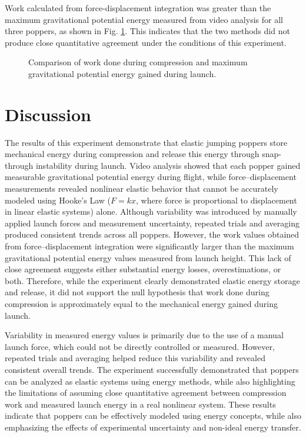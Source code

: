 \documentclass[12pt]{article}
\begin{document}
Work calculated from force-displacement integration was greater than the maximum gravitational potential energy measured from video analysis for all three poppers, as shown in Fig. \ref{fig:3}. This indicates that the two methods did not produce close quantitative agreement under the conditions of this experiment.

\begin{figure}[H]
    \centering
    
    \caption{Comparison of work done during compression and maximum gravitational potential energy gained during launch.}
    \label{fig:3}
\end{figure}

\section{Discussion}
The results of this experiment demonstrate that elastic jumping poppers store mechanical energy during compression and release this energy through snap-through instability during launch. Video analysis showed that each popper gained measurable gravitational potential energy during flight, while force--displacement measurements revealed nonlinear elastic behavior that cannot be accurately modeled using Hooke’s Law ($F = kx$, where force is proportional to displacement in linear elastic systems) alone. Although variability was introduced by manually applied launch forces and measurement uncertainty, repeated trials and averaging produced consistent trends across all poppers. However, the work values obtained from force--displacement integration were significantly larger than the maximum gravitational potential energy values measured from launch height. This lack of close agreement suggests either substantial energy losses, overestimations, or both. Therefore, while the experiment clearly demonstrated elastic energy storage and release, it did not support the null hypothesis that work done during compression is approximately equal to the mechanical energy gained during launch.

Variability in measured energy values is primarily due to the use of a manual launch force, which could not be directly controlled or measured. However, repeated trials and averaging helped reduce this variability and revealed consistent overall trends. The experiment successfully demonstrated that poppers can be analyzed as elastic systems using energy methods, while also highlighting the limitations of assuming close quantitative agreement between compression work and measured launch energy in a real nonlinear system. These results indicate that poppers can be effectively modeled using energy concepts, while also emphasizing the effects of experimental uncertainty and non-ideal energy transfer.
\end{document}

